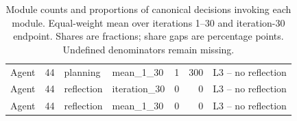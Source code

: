 \begin{table}[htbp!]
\begin{tabular}{lrllrrl}
Agent & 44 & planning & mean\_1\_30 & 1 & 300 & L3 -- no reflection \\
Agent & 44 & reflection & iteration\_30 & 0 & 0 & L3 -- no reflection \\
Agent & 44 & reflection & mean\_1\_30 & 0 & 0 & L3 -- no reflection \\
\hline
\end{tabular}
\caption{Module counts and proportions of canonical decisions invoking each module. Equal-weight mean over iterations 1--30 and iteration-30 endpoint. Shares are fractions; share gaps are percentage points. Undefined denominators remain missing.}
\label{chap:results:tab:rq3_agents_module_rates}
\end{table}
